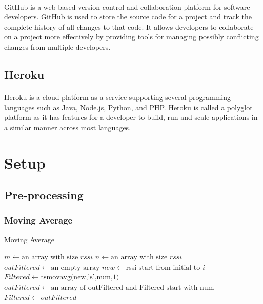\paragraph{}GitHub is a web-based version-control and collaboration platform for software developers. GitHub is used to store the source code for a project and track the complete history of all changes to that code. It allows developers to collaborate on a project more effectively by providing tools for managing possibly conflicting changes from multiple developers. 
\subsection{Heroku}
\paragraph{}Heroku is a cloud platform as a service supporting several programming languages such as Java, Node.js, Python, and PHP. Heroku is called a polyglot platform as it has features for a developer to build, run and scale applications in a similar manner across most languages.  
\section{Setup}
\subsection{Pre-processing}
\subsubsection{Moving Average}
\begin{algorithm}
\caption{Moving Average}
\begin{algorithmic}[1]
\State $m\gets \text{an array with size $rssi$}$
\State $n\gets \text{an array with size $rssi$}$
\State $outFiltered\gets \text{an empty array}$
    \State $new \gets $rssi$ \text{ start from initial to } i$
    \State $Filtered \gets \text{tsmovavg(new,'s',num,1)} $
    \State $outFiltered \gets \text{an array of outFiltered and Filtered start with num}$
\EndFor
\State $Filtered \gets outFiltered$
\EndProcedure
\end{algorithmic}
\end{algorithm}


\newpage
